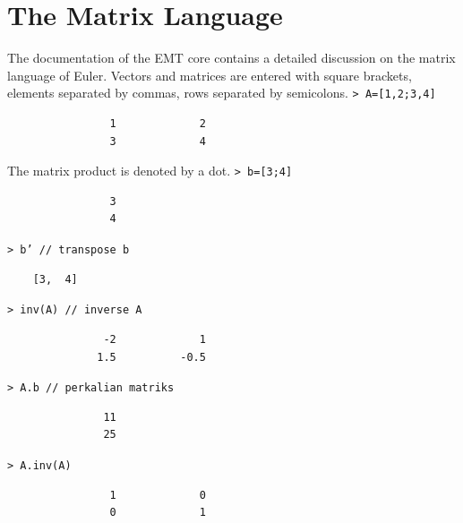 \documentclass[11pt, a4paper]{article}
\newcommand{\emtcmd}[1]{\noindent\texttt{\textcolor{emtcommand}{>}\ #1}\par\smallskip}
\begin{document}
\section*{The Matrix Language}

The documentation of the EMT core contains a detailed discussion on the matrix language of Euler. Vectors and matrices are entered with square brackets, elements separated by commas, rows separated by semicolons.
\emtcmd{A=[1,2;3,4]}
\begin{verbatim}
                1             2
                3             4
\end{verbatim}

The matrix product is denoted by a dot.
\emtcmd{b=[3;4]}
\begin{verbatim}
                3
                4
\end{verbatim}
\emtcmd{b' \textcolor{emtcomment}{// transpose b}}
\begin{verbatim}
    [3,  4]
\end{verbatim}
\emtcmd{inv(A) \textcolor{emtcomment}{// inverse A}}
\begin{verbatim}
               -2             1
              1.5          -0.5
\end{verbatim}
\emtcmd{A.b \textcolor{emtcomment}{// perkalian matriks}}
\begin{verbatim}
               11
               25
\end{verbatim}
\emtcmd{A.inv(A)}
\begin{verbatim}
                1             0
                0             1
\end{verbatim}
\end{document}
